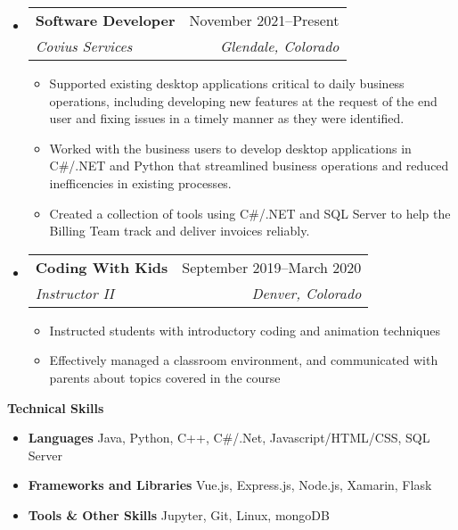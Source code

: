 \documentclass[letterpaper,12pt]{article}[leftmargin=*]
\makeatletter
\def \entryspacing {-0pt}
\renewcommand{\section}[2]{\vspace{5pt}
  \colorbox{secondary}{\color{white}\raggedbottom\normalsize\textbf{{#1}{\hspace{7pt}#2}}}
}
\newcommand{\resumeEntryStart}{\begin{itemize}[leftmargin=2.5mm]}
\newcommand{\resumeEntryEnd}{\end{itemize}\vspace{\entryspacing}}
\newcommand{\resumeItemListStart}{\begin{itemize}[leftmargin=4.5mm]}
\newcommand{\resumeItemListEnd}{\end{itemize}}
\newcommand{\resumeItem}[1]{
  \item\small{
    {#1 \vspace{-2pt}}
  }
}
\newcommand{\resumeEntryTSDL}[4]{
  \vspace{-1pt}\item[]
    \begin{tabularx}{0.97\textwidth}{X@{\hspace{60pt}}r}
      \textbf{\color{primary}#1} & {\firabook\color{accent}\small#2} \\
      \textit{\color{accent}\small#3} & \textit{\color{accent}\small#4} \\
    \end{tabularx}\vspace{-6pt}
}
\newcommand{\resumeEntryS}[2]{
  \item[]\small{
    \textbf{\color{primary}#1 }{ #2 \vspace{-6pt}}
  }
}
\makeatother
\begin{document}
  \resumeEntryStart
  \resumeEntryTSDL
  {Software Developer}{November 2021--Present}
  {Covius Services}{Glendale, Colorado}
   
  \resumeItemListStart
  \resumeItem{Supported existing desktop applications critical to daily business operations, including developing new features at the request of the end user and fixing issues in a timely manner as they were identified.}
  \resumeItem{Worked with the business users to develop desktop applications in C\#/.NET and Python that streamlined business operations and reduced inefficencies in existing processes.}
  \resumeItem{Created a collection of tools using C\#/.NET and SQL Server to help the Billing Team track and deliver invoices reliably.}
  \resumeItemListEnd
\resumeEntryEnd

\resumeEntryStart
\resumeEntryTSDL
  {Coding With Kids}{September 2019--March 2020}
  {Instructor II}{Denver, Colorado}
\resumeItemListStart
  \resumeItem {Instructed students with introductory coding and animation techniques}
  \resumeItem {Effectively managed a classroom environment, and communicated with parents about topics covered in the course} 
\resumeItemListEnd
\resumeEntryEnd


 


 


\section{\faGears}{Technical Skills}
 \resumeEntryStart
  \resumeEntryS{Languages } {Java, Python, C++, C\#/.Net, Javascript/HTML/CSS, SQL Server}
  \resumeEntryS{Frameworks and Libraries } {Vue.js, Express.js, Node.js, Xamarin, Flask}
  \resumeEntryS{Tools \& Other Skills }{ Jupyter, Git, Linux, mongoDB}
 \resumeEntryEnd
\end{document}
